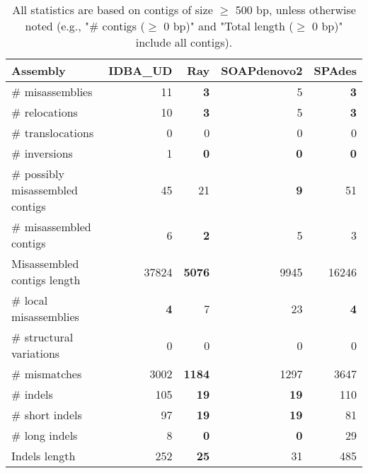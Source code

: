 \documentclass[12pt,a4paper]{article}
\begin{document}
\begin{table}[ht]
\begin{center}
\caption{All statistics are based on contigs of size $\geq$ 500 bp, unless otherwise noted (e.g., "\# contigs ($\geq$ 0 bp)" and "Total length ($\geq$ 0 bp)" include all contigs).}
\begin{tabular}{|l*{4}{|r}|}
\hline
Assembly & IDBA\_UD & Ray & SOAPdenovo2 & SPAdes \\ \hline
\# misassemblies & 11 & {\bf 3} & 5 & {\bf 3} \\ \hline
\hspace{5mm}\# relocations & 10 & {\bf 3} & 5 & {\bf 3} \\ \hline
\hspace{5mm}\# translocations & 0 & 0 & 0 & 0 \\ \hline
\hspace{5mm}\# inversions & 1 & {\bf 0} & {\bf 0} & {\bf 0} \\ \hline
\# possibly misassembled contigs & 45 & 21 & {\bf 9} & 51 \\ \hline
\# misassembled contigs & 6 & {\bf 2} & 5 & 3 \\ \hline
Misassembled contigs length & 37824 & {\bf 5076} & 9945 & 16246 \\ \hline
\# local misassemblies & {\bf 4} & 7 & 23 & {\bf 4} \\ \hline
\# structural variations & 0 & 0 & 0 & 0 \\ \hline
\# mismatches & 3002 & {\bf 1184} & 1297 & 3647 \\ \hline
\# indels & 105 & {\bf 19} & {\bf 19} & 110 \\ \hline
\hspace{5mm}\# short indels & 97 & {\bf 19} & {\bf 19} & 81 \\ \hline
\hspace{5mm}\# long indels & 8 & {\bf 0} & {\bf 0} & 29 \\ \hline
Indels length & 252 & {\bf 25} & 31 & 485 \\ \hline
\end{tabular}
\end{center}
\end{table}
\end{document}
